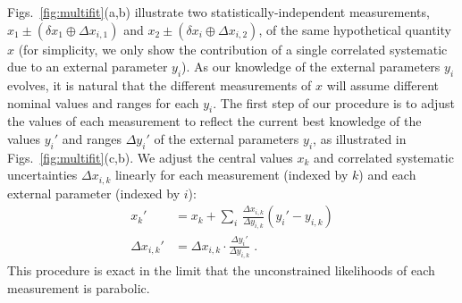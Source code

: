 Figs.~\ref{fig:multifit}(a,b) illustrate two
statistically-independent measurements, $x_1 \pm (\delta x_1 \oplus
\Delta x_{i,1})$ and $x_2\pm(\delta x_i\oplus \Delta x_{i,2})$, of the same
hypothetical quantity $x$ (for simplicity, we only show the
contribution of a single correlated systematic due to an external
parameter $y_i$). As our knowledge of the external parameters $y_i$
evolves, it is natural that the different measurements of $x$ will
assume different nominal values and ranges for each $y_i$. The first
step of our procedure is to adjust the values of each measurement to
reflect the current best knowledge of the values $y_i'$ and ranges
$\Delta y_i'$ of the external parameters $y_i$, as illustrated in
Figs.~\ref{fig:multifit}(c,b). We adjust the
central values $x_k$ and correlated systematic uncertainties $\Delta
x_{i,k}$ linearly for each measurement (indexed by $k$) and each
external parameter (indexed by $i$):
\begin{align}
x_k' &= x_k + \sum_i\,\frac{\Delta x_{i,k}}{\Delta y_{i,k}}
\left(y_i'-y_{i,k}\right)\\
\Delta x_{i,k}'&= \Delta x_{i,k}\cdot \frac{\Delta y_i'}{\Delta
  y_{i,k}} \; .
\end{align}
This procedure is exact in the limit that the unconstrained
likelihoods of each measurement is parabolic.

